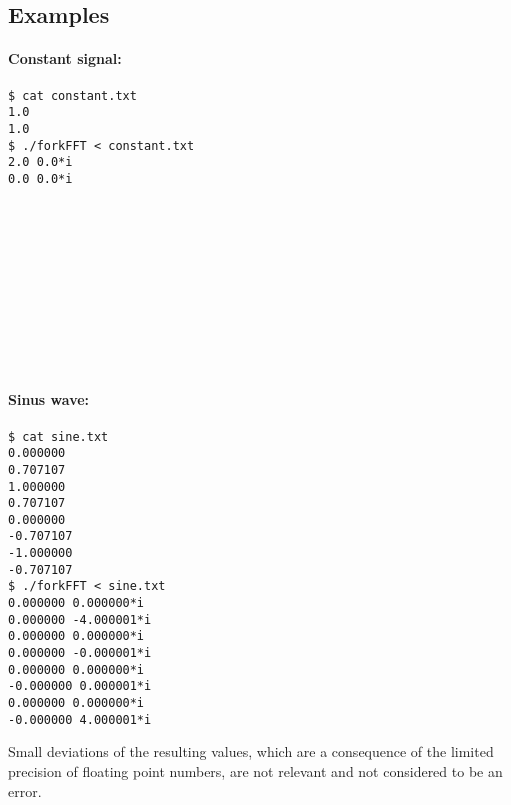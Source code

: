 \subsection*{Examples}
\begin{multicols}{2}
\paragraph{Constant signal:}
\begin{verbatim}
$ cat constant.txt
1.0
1.0
$ ./forkFFT < constant.txt
2.0 0.0*i
0.0 0.0*i












\end{verbatim}

\paragraph{Sinus wave:}
\begin{verbatim}
$ cat sine.txt
0.000000
0.707107
1.000000
0.707107
0.000000
-0.707107
-1.000000
-0.707107
$ ./forkFFT < sine.txt
0.000000 0.000000*i
0.000000 -4.000001*i
0.000000 0.000000*i
0.000000 -0.000001*i
0.000000 0.000000*i
-0.000000 0.000001*i
0.000000 0.000000*i
-0.000000 4.000001*i
\end{verbatim}
\end{multicols}

Small deviations of the resulting values,
which are a consequence of the limited precision of floating point numbers,
are not relevant and not considered to be an error.



\osueguidelinestwo


